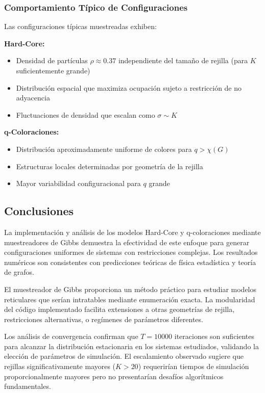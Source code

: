 \subsubsection{Comportamiento Típico de Configuraciones}

Las configuraciones típicas muestreadas exhiben:

\textbf{Hard-Core:}
\begin{itemize}
\item Densidad de partículas $\rho \approx 0.37$ independiente del tamaño de rejilla (para $K$ suficientemente grande)
\item Distribución espacial que maximiza ocupación sujeto a restricción de no adyacencia
\item Fluctuaciones de densidad que escalan como $\sigma \sim K$
\end{itemize}

\textbf{q-Coloraciones:}
\begin{itemize}
\item Distribución aproximadamente uniforme de colores para $q > \chi(G)$
\item Estructuras locales determinadas por geometría de la rejilla
\item Mayor variabilidad configuracional para $q$ grande
\end{itemize}

\subsection{Conclusiones}

La implementación y análisis de los modelos Hard-Core y q-coloraciones mediante muestreadores de Gibbs demuestra la efectividad de este enfoque para generar configuraciones uniformes de sistemas con restricciones complejas. Los resultados numéricos son consistentes con predicciones teóricas de física estadística y teoría de grafos.

El muestreador de Gibbs proporciona un método práctico para estudiar modelos reticulares que serían intratables mediante enumeración exacta. La modularidad del código implementado facilita extensiones a otras geometrías de rejilla, restricciones alternativas, o regímenes de parámetros diferentes.

Los análisis de convergencia confirman que $T=10000$ iteraciones son suficientes para alcanzar la distribución estacionaria en los sistemas estudiados, validando la elección de parámetros de simulación. El escalamiento observado sugiere que rejillas significativamente mayores ($K > 20$) requerirían tiempos de simulación proporcionalmente mayores pero no presentarían desafíos algorítmicos fundamentales.
